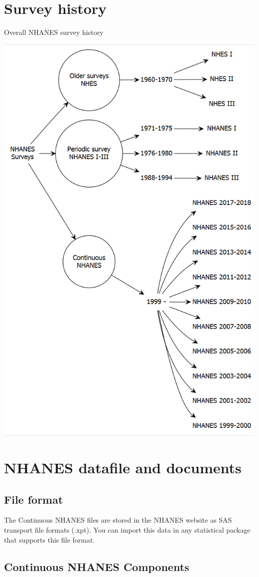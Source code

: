 \documentclass[
]{book}
\begin{document}
\hypertarget{survey-history}{%
\section{Survey history}\label{survey-history}}

Overall NHANES survey history

\includegraphics[width=0.65\linewidth]{images/g1}

\hypertarget{nhanes-datafile-and-documents}{%
\section{NHANES datafile and documents}\label{nhanes-datafile-and-documents}}

\hypertarget{file-format}{%
\subsection{File format}\label{file-format}}

The Continuous NHANES files are stored in the NHANES website as SAS transport file formats (.xpt). You can import this data in any statistical package that supports this file format.

\hypertarget{continuous-nhanes-components}{%
\subsection{Continuous NHANES Components}\label{continuous-nhanes-components}}
\end{document}

